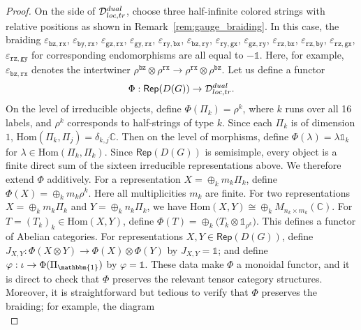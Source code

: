 \documentclass[10pt,a4paper]{amsart}
\theoremstyle{definition}
\theoremstyle{remark}
\theoremstyle{remark}
\newcommand\Rep {\mathsf{Rep}}
\newcommand\End {\mathrm{End}}
\newcommand\Hom {\mathrm{Hom}}
\newcommand{\one}{\mathbbm{1}}
\begin{document}
\begin{proof}
    On the side of $\mathcal{D}_{\rm loc, tr}^{\rm dual}$, choose three half-infinite colored strings with relative positions as shown in Remark~\ref{rem:gauge_braiding}. 
    In this case,  the braiding $\varepsilon_{\mathtt{bz},\mathtt{rx}}$, $\varepsilon_{\mathtt{by},\mathtt{rx}}$, $\varepsilon_{\mathtt{gz},\mathtt{rx}}$, $\varepsilon_{\mathtt{gy},\mathtt{rx}}$, $\varepsilon_{\mathtt{ry},\mathtt{bx}}$, $\varepsilon_{\mathtt{bz},\mathtt{ry}}$, $\varepsilon_{\mathtt{ry},\mathtt{gx}}$, $\varepsilon_{\mathtt{gz},\mathtt{ry}}$, $\varepsilon_{\mathtt{rz},\mathtt{bx}}$, $\varepsilon_{\mathtt{rz},\mathtt{by}}$, $\varepsilon_{\mathtt{rz},\mathtt{gx}}$, 
    $\varepsilon_{\mathtt{rz},\mathtt{gy}}$ for corresponding endomorphisms are all equal to $-\mathds{1}$. 
    Here, for example, $\varepsilon_{\mathtt{bz},\mathtt{rx}}$ denotes the intertwiner $\rho^{\mathtt{bz}}\otimes \rho^{\mathtt{rx}} \to \rho^{\mathtt{rx}}\otimes \rho^{\mathtt{bz}}$.
    Let us define a functor 
    \[
        \Phi:\Rep(D(G)) \to \mathcal{D}_{\rm loc, tr}^{\rm dual}. 
    \]
    On the level of irreducible objects, define $\Phi(\Pi_k) = \rho^k$, where $k$ runs over all 16 labels, and $\rho^k$ corresponds to half-strings of type $k$. 
    Since each $\Pi_k$ is of dimension $1$, $\Hom(\Pi_k,\Pi_j) = \delta_{k,j}\mathbb{C}$. 
    Then on the level of morphisms, define $\Phi(\lambda) = \lambda\mathds{1}_k$ for $\lambda\in \Hom(\Pi_k,\Pi_k)$. 
    Since $\Rep(D(G))$ is semisimple, every object is a finite direct sum of the sixteen irreducible representations above. We therefore extend $\Phi$ additively. 
    For a representation $X = \oplus_k m_k\Pi_k$, define $\Phi(X) = \oplus_k m_k\rho^k$. Here all multiplicities $m_k$ are finite. For two representations $X=\oplus_k m_k\Pi_k$ and $Y= \oplus_k n_k\Pi_k$, we have $\Hom(X,Y) \cong \oplus_k M_{n_k\times m_k}(\mathbb C)$. 
    For $T=(T_k)_k\in\Hom(X,Y)$, 
    define $\Phi(T)=\oplus_k\bigl(T_k\otimes\mathds{1}_{\rho^k}\bigr)$.  
    This defines a functor of Abelian categories. 
    For representations $X,Y\in \Rep(D(G))$, define $J_{X,Y}:\Phi(X\otimes Y) \to \Phi(X)\otimes \Phi(Y)$ by $J_{X,Y}=\mathds{1}$; and define $\varphi:\iota \to \Phi(\Pi_{\one})$ by $\varphi = \mathds{1}$. 
    These data make $\Phi$ a monoidal functor, and it is direct to check that $\Phi$ preserves the relevant tensor category structures. 
    Moreover, it is straightforward but tedious to verify that $\Phi$ preserves the braiding; for example, the diagram
    \begin{equation*}

\end{equation*}
\end{proof}
\end{document}
